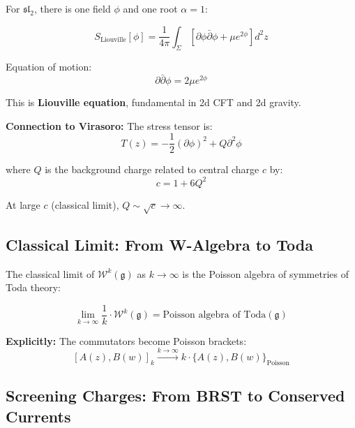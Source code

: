 \begin{example}[$\mathfrak{sl}_2$ Toda = Liouville Theory]
\label{ex:sl2-liouville}
For $\mathfrak{sl}_2$, there is one field $\phi$ and one root $\alpha = 1$:

$$S_{\text{Liouville}}[\phi] = \frac{1}{4\pi} \int_\Sigma 
\left[\partial\phi \bar{\partial}\phi + \mu e^{2\phi}\right] d^2z$$

Equation of motion:
$$\partial\bar{\partial}\phi = 2\mu e^{2\phi}$$

This is \textbf{Liouville equation}, fundamental in 2d CFT and 2d gravity.

\textbf{Connection to Virasoro:} The stress tensor is:
$$T(z) = -\frac{1}{2}(\partial\phi)^2 + Q\partial^2\phi$$

where $Q$ is the background charge related to central charge $c$ by:
$$c = 1 + 6Q^2$$

At large $c$ (classical limit), $Q \sim \sqrt{c} \to \infty$.
\end{example}

\subsection{Classical Limit: From W-Algebra to Toda}

\begin{theorem}
\label{thm:classical-limit-w-to-toda}
The classical limit of $\mathcal{W}^k(\mathfrak{g})$ as $k \to \infty$ is the 
Poisson algebra of symmetries of Toda theory:

$$\lim_{k \to \infty} \frac{1}{k} \cdot \mathcal{W}^k(\mathfrak{g}) = 
\text{Poisson algebra of } \text{Toda}(\mathfrak{g})$$

\textbf{Explicitly:} The commutators become Poisson brackets:
$$[A(z), B(w)]_k \xrightarrow{k \to \infty} k \cdot \{A(z), B(w)\}_{\text{Poisson}}$$
\end{theorem}

\subsection{Screening Charges: From BRST to Conserved Currents}

